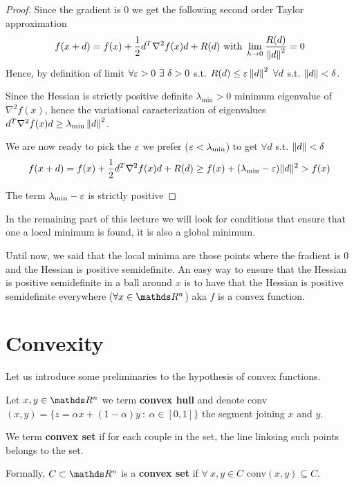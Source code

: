 \documentclass[computationalMathematics.tex]{subfiles}
\begin{document}
\begin{proof}
Since the gradient is $0$ we get the following second order Taylor approximation
\[
  f(x + d) = f(x) + \frac{1}{2} d^T \nabla^2 f(x) d + R(d)\mbox{ with } \lim\limits_{h \to 0} \frac{R(d)}{\left\lVert d\right\rVert^2} = 0
\]
  Hence, by definition of limit $\forall \varepsilon > 0~\exists~\delta > 0$ s.t. $R(d) \leq \varepsilon \left\lVert d\right\rVert^2~\forall d$ s.t. $\left\lVert d\right\rVert < \delta$.

Since the Hessian is strictly positive definite $\lambda_{\text{min}} > 0$ minimum eigenvalue of $\nabla^2 f(x)$, hence the variational caracterization of eigenvalues $d^T \nabla^2 f(x) d \geq \lambda_{\text{min}} \left\lVert d\right\rVert^2$.

  We are now ready to pick the $\varepsilon$ we prefer ($\varepsilon < \lambda_{\text{min}}$) to get $\forall d$ s.t. $\left\lVert d\right\rVert < \delta$
\[
  f(x + d) = f(x) + \frac{1}{2} d^T \nabla^2 f(x) d + R(d) \geq f(x) + (\lambda_{\text{min}} - \varepsilon)\|d\|^2 > f(x)
\]

  The term $\lambda_{\text{min}} - \varepsilon$ is strictly positive
\end{proof}

In the remaining part of this lecture we will look for conditions that ensure that one a local minimum is found, it is also a global minimum.

Until now, we said that the local minima are those points where the fradient is $0$ and the Hessian is positive semidefinite.
An easy way to ensure that the Hessian is positive semidefinite in a ball around $x$ is to have that the Hessian is positive semidefinite everywhere ($\forall x \in \R^n$) aka $f$ is a convex function.

\section{Convexity}
Let us introduce some preliminaries to the hypothesis of convex functions.

\begin{definition}
  Let $x, y \in \R^n$ we term \textbf{convex hull} and denote conv$(x, y) = \{z = \alpha x + ( 1 - \alpha ) y~:~ \alpha \in [0, 1]\}$ the segment joining $x$ and $y$.
\end{definition}

\begin{definition}
  We term \textbf{convex set} if for each couple in the set, the line linksing such points belongs to the set.

  Formally, $C \subset \R^n$ is a \textbf{convex set} if $\forall~x, y \in C$ conv$(x,y) \subseteq C$.
\end{definition}
\end{document}
